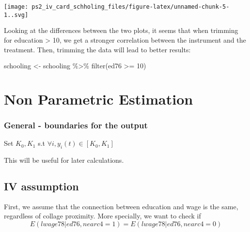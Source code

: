 \documentclass[
]{article}
\newenvironment{Shaded}{\begin{snugshade}}{\end{snugshade}}
\newcommand{\DecValTok}[1]{\textcolor[rgb]{0.00,0.00,0.81}{#1}}
\newcommand{\FunctionTok}[1]{\textcolor[rgb]{0.00,0.00,0.00}{#1}}
\newcommand{\NormalTok}[1]{#1}
\newcommand{\OtherTok}[1]{\textcolor[rgb]{0.56,0.35,0.01}{#1}}
\newcommand{\SpecialCharTok}[1]{\textcolor[rgb]{0.00,0.00,0.00}{#1}}
\begin{document}
\texttt{[image: ps2\_iv\_card\_schholing\_files/figure-latex/unnamed-chunk-5-1..svg]}

Looking at the differences between the two plots, it seems that when
trimming for education \textgreater{} 10, we get a stronger correlation
between the instrument and the treatment. Then, trimming the data will
lead to better results:

\begin{Shaded}
\begin{Highlighting}[]
\NormalTok{schooling }\OtherTok{\textless{}{-}}\NormalTok{ schooling }\SpecialCharTok{\%\textgreater{}\%} 
  \FunctionTok{filter}\NormalTok{(ed76 }\SpecialCharTok{\textgreater{}=} \DecValTok{10}\NormalTok{)}
\end{Highlighting}
\end{Shaded}

\hypertarget{non-parametric-estimation}{%
\section{Non Parametric Estimation}\label{non-parametric-estimation}}

\hypertarget{general---boundaries-for-the-output}{%
\subsubsection{General - boundaries for the
output}\label{general---boundaries-for-the-output}}

Set \(K_0, K_1\) s.t \(\forall i, y_i (t) \in [K_0, K_1]\)

\begin{Shaded}
\end{Shaded}

This will be useful for later calculations.

\hypertarget{iv-assumption}{%
\subsection{IV assumption}\label{iv-assumption}}

First, we assume that the connection between education and wage is the
same, regardless of collage proximity. More specially, we want to check
if \[E(lwage78|ed76, nearc4 =1) = E(lwage78|ed76, nearc4 =0)\]
\end{document}
